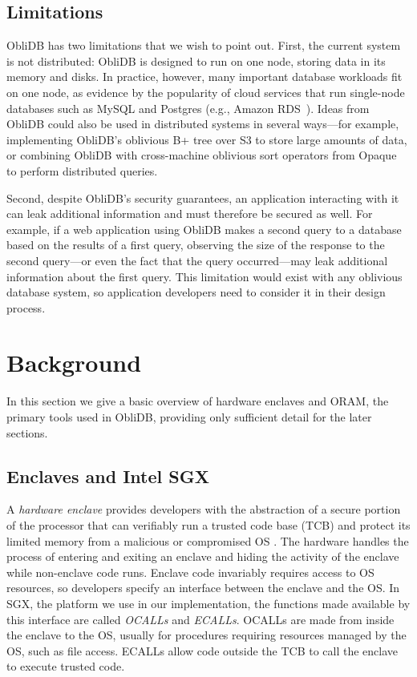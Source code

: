 \documentclass[letterpaper,twocolumn,10pt]{article}
\def\name/{ObliDB}
\begin{document}
\subsection{Limitations}

\name/ has two limitations that we wish to point out. First, the current system is not distributed: \name/ is designed to run on one node, storing data in its memory and disks. In practice, however, many important database workloads fit on one node, as evidence by the popularity of cloud services that run single-node databases such as MySQL and Postgres (e.g., Amazon RDS~\cite{amazon-rds}). Ideas from \name/ could also be used in distributed systems in several ways---for example, implementing \name/'s oblivious B+ tree over S3 to store large amounts of data, or combining \name/ with cross-machine oblivious sort operators from Opaque~\cite{ZDB+17} to perform distributed queries.

Second, despite \name/'s security guarantees, an application interacting with it can leak additional information and must therefore be secured as well. For example, if a web application using \name/ makes a second query to a database based on the results of a first query, observing the size of the response to the second query---or even the fact that the query occurred---may leak additional information about the first query. This limitation would exist with any oblivious database system, so application developers need to consider it in their design process.

\section{Background}\label{background}
In this section we give a basic overview of hardware enclaves and ORAM, the primary tools used in \name/, providing only sufficient detail for the later sections.

\subsection{Enclaves and Intel SGX}

A \emph{hardware enclave} provides developers with the abstraction of a secure portion of the processor that can verifiably run a trusted code base (TCB) and protect its limited memory from a malicious or compromised OS \cite{CD16, SGXRef}. The hardware handles the process of entering and exiting an enclave and hiding the activity of the enclave while non-enclave code runs. Enclave code invariably requires access to OS resources, so developers specify an interface between the enclave and the OS. In SGX, the platform we use in our implementation, the functions made available by this interface are called \textit{OCALLs} and \textit{ECALLs}. OCALLs are made from inside the enclave to the OS, usually for procedures requiring resources managed by the OS, such as file access. ECALLs allow code outside the TCB to call the enclave to execute trusted code.
\end{document}
